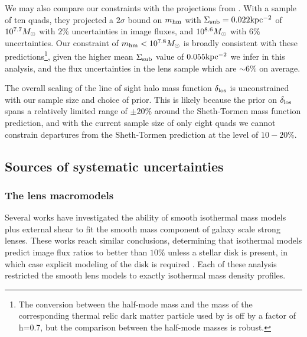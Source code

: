 We may also compare our constraints with the projections from  \cite{Gilman++19}. With a sample of ten quads, they projected a $2 \sigma$ bound on ${m_{\rm{hm}}}$ with $\Sigma_{\rm{sub}} = 0.022 \rm{kpc^{-2}}$ of $10^{7.7} {M_{\odot}}$ with $2\%$ uncertainties in image fluxes, and $10^{8.6} {M_{\odot}}$ with $6 \%$ uncertainties. Our constraint of ${m_{\rm{hm}}} < 10^{7.8} {M_{\odot}}$ is broadly consistent with these predictions\footnote{The conversion between the half-mode mass and the mass of the corresponding thermal relic dark matter particle used by \cite{Gilman++19} is off by a factor of h=0.7, but the comparison between the half-mode masses is robust.}, given the higher mean $\Sigma_{\rm{sub}}$ value of $0.055 \rm{kpc^{-2}}$ we infer in this analysis, and the flux uncertainties in the lens sample which are $\sim 6 \%$ on average. 

The overall scaling of the line of sight halo mass function $\delta_{\rm{los}}$ is unconstrained with our sample size and choice of prior. This is likely because the prior on $\delta_{\rm{los}}$ spans a relatively limited range of $\pm 20\%$ around the Sheth-Tormen mass function prediction, and with the current sample size of only eight quads we cannot constrain departures from the Sheth-Tormen prediction at the level of $10-20\%$. 

\subsection{Sources of systematic uncertainties}
\label{ssec:systematics}
\subsubsection{The lens macromodels}
Several works \cite{Gilman++17,Hsueh++18} have investigated the ability of smooth isothermal mass models plus external shear to fit the smooth mass component of galaxy scale strong lenses. These works reach similar conclusions, determining that isothermal models predict image flux ratios to better than $10 \%$ unless a stellar disk is present, in which case explicit modeling of the disk is required \cite[e.g.][]{Hsueh++17,Hsueh++18}. Each of these analysis restricted the smooth lens models to exactly isothermal mass density profiles. 

